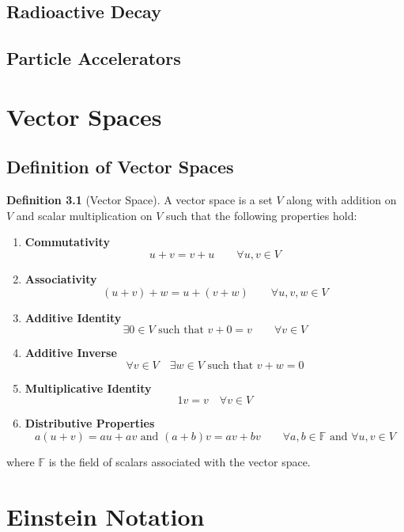 \documentclass[oneside]{book}
\numberwithin{figure}{section}
\numberwithin{equation}{section}
\theoremstyle{definition}
\newtheorem{definition}{Definition}[section]
\begin{document}
	\section{Radioactive Decay}
	\section{Particle Accelerators}

	\appendix
	\chapter{Vector Spaces}
	\section{Definition of Vector Spaces}
	\begin{definition}[Vector Space]
		A vector space is a set $ V $ along with addition on $ V $ and scalar multiplication on $ V $ such that the following properties hold:
		\begin{enumerate}[label=\roman*.]
			\item \textbf{Commutativity}
			\[ u + v = v + u \qquad \forall u,v \in V \]
			
			\item \textbf{Associativity}
			\[ (u + v) + w = u + (v + w) \qquad \forall u,v,w \in V \]
			
			\item \textbf{Additive Identity}
			\[ \exists 0 \in V \text{ such that } v + 0 = v \qquad \forall v \in V \]
			
			\item \textbf{Additive Inverse}
			\[ \forall v \in V \quad \exists w \in V \text{ such that } v + w = 0  \]
			
			\item \textbf{Multiplicative Identity}
			\[ 1v = v \quad \forall v \in V \]
			
			\item \textbf{Distributive Properties}
			\[ a(u + v) = au + av \text{ and } (a + b)v = av + bv \qquad \forall a,b \in \mathbb{F} \text{ and } \forall u,v \in V \]
		\end{enumerate}
		where $ \mathbb{F} $ is the field of scalars associated with the vector space.
	\end{definition}

	\chapter{Einstein Notation}
\end{document}
